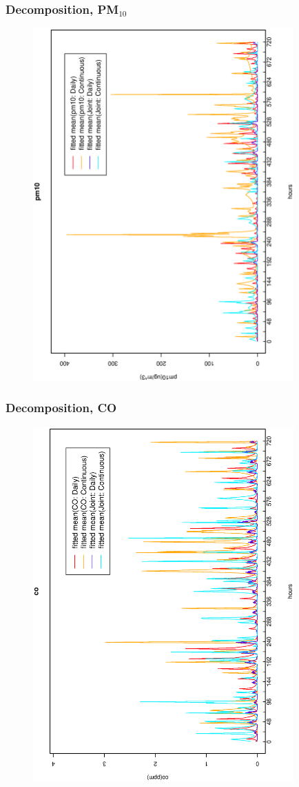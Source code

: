 \documentclass[dvips]{beamer}
\newcommand{\bs}[2]{\begin{frame} \frametitle{#1} 
{#2}
\end{frame} }
\begin{document}
\bs{Decomposition, PM$_{10}$} {
\begin{figure}[!h]
  \begin{center}
    \includegraphics[angle=270,origin=l,totalheight=6truecm,
     clip=1,width=10cm]{30dayjointdecpm10.ps}
  \end{center}
\end{figure}
}
\bs{Decomposition, CO} {
\begin{figure}[!h]
  \begin{center}
    \includegraphics[angle=270,origin=l,totalheight=6truecm,
     clip=1,width=10cm]{30dayjointdecco.ps}
  \end{center}
\end{figure}
}
\end{document}
